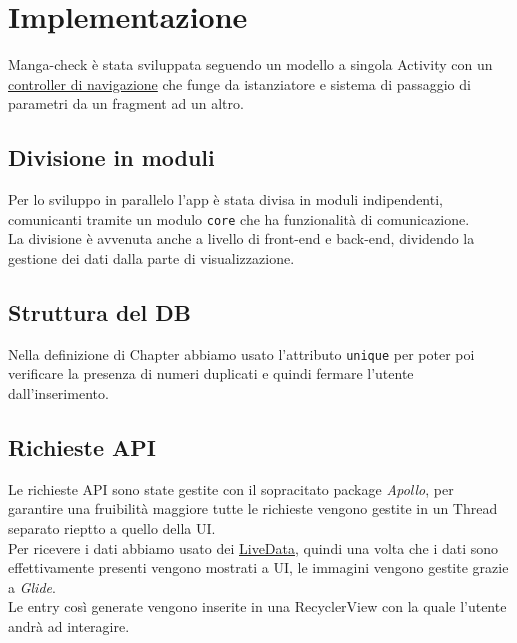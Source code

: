 \documentclass[../Assignment-3-LPSMT.tex]{subfiles}
\begin{document}
\chapter{Implementazione}

Manga-check è stata sviluppata seguendo un modello a singola Activity con un
\href{https://developer.android.com/guide/navigation}{controller di navigazione}
che funge da istanziatore e sistema di passaggio di parametri da un fragment ad un altro.\\

\section{Divisione in moduli}

Per lo sviluppo in parallelo l'app è stata divisa in moduli indipendenti, comunicanti tramite un modulo \texttt{core} che ha  funzionalità di comunicazione.\\
La divisione è avvenuta anche a livello di front-end e back-end, dividendo la gestione dei dati dalla parte di visualizzazione.

\section{Struttura del DB}





Nella definizione di Chapter abbiamo usato l'attributo \texttt{unique} per poter poi verificare la presenza di numeri duplicati e quindi fermare l'utente dall'inserimento.

\section{Richieste API}

Le richieste API sono state gestite con il sopracitato package \emph{Apollo}, per garantire una fruibilità maggiore tutte le richieste vengono gestite in un Thread separato rieptto a quello della UI.\\
Per ricevere i dati abbiamo usato dei \href{https://developer.android.com/reference/kotlin/androidx/lifecycle/LiveData}{LiveData}, quindi una volta che i dati sono effettivamente presenti vengono mostrati a UI, le immagini vengono gestite grazie a \emph{Glide}.\\
Le entry così generate vengono inserite in una RecyclerView con la quale l'utente andrà ad interagire.
\end{document}
